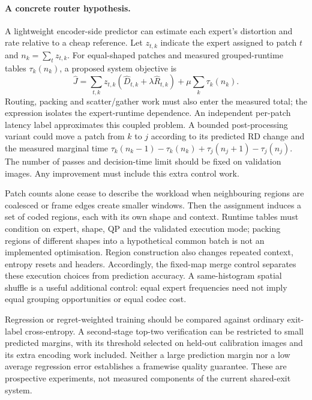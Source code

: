 \paragraph{A concrete router hypothesis.}
A lightweight encoder-side predictor can estimate each expert's distortion
and rate relative to a cheap reference. Let $z_{t,k}$ indicate the expert
assigned to patch $t$ and $n_k=\sum_t z_{t,k}$. For equal-shaped patches and
measured grouped-runtime tables $\tau_k(n_k)$, a proposed system objective is
\begin{equation}
 \widehat J=\sum_{t,k}z_{t,k}(\widehat D_{t,k}+\lambda\widehat R_{t,k})
 +\mu\sum_k\tau_k(n_k).
 \label{eq:proposed}
\end{equation}
Routing, packing and scatter/gather work must also enter the measured total;
the expression isolates the expert-runtime dependence. An independent
per-patch latency label approximates this coupled problem. A bounded
post-processing variant could move a patch from $k$ to $j$ according to its
predicted RD change and the measured marginal time
$\tau_k(n_k-1)-\tau_k(n_k)+\tau_j(n_j+1)-\tau_j(n_j)$.
The number of passes and decision-time limit should be fixed on validation
images. Any improvement must include this extra control work.

Patch counts alone cease to describe the workload when neighbouring regions
are coalesced or frame edges create smaller windows. Then the assignment
induces a set of coded regions, each with its own shape and context. Runtime
tables must condition on expert, shape, QP and the validated execution mode;
packing regions of different shapes into a hypothetical common batch is not
an implemented optimisation. Region construction also changes repeated
context, entropy resets and headers. Accordingly, the fixed-map merge control
separates these execution choices from prediction accuracy. A same-histogram
spatial shuffle is a useful additional control: equal expert frequencies need
not imply equal grouping opportunities or equal codec cost.

Regression or regret-weighted training should be compared against ordinary
exit-label cross-entropy. A second-stage top-two verification can be
restricted to small predicted margins, with its threshold selected on
held-out calibration images and its extra encoding work included. Neither
a large prediction margin nor a low average regression error establishes a
framewise quality guarantee. These are prospective experiments, not measured
components of the current shared-exit system.

